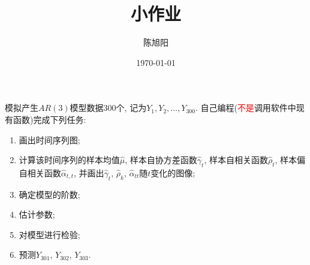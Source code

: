 \documentclass[chinese, lineno, watermark]{assignment}
\title{小作业}
\author{陈旭阳}
\date{\today}
\institute{同济大学数学科学学院}
\begin{document}
    \maketitle

    \begin{problem}
        模拟产生$AR(3)$模型数据300个, 记为$Y_{1}, Y_{2}, \dotsc, Y_{300}$. 自己编程(\textcolor{red}{不是}调用软件中现有函数)完成下列任务:
        \begin{enumerate}[(1)]
            \item 画出时间序列图;
            \item 计算该时间序列的样本均值$\hat{\mu}$, 样本自协方差函数$\hat{\gamma}_{t}$, 样本自相关函数$\hat{\rho}_{t}$, 样本偏自相关函数$\hat{\alpha}_{t, t}$, 并画出$\hat{\gamma}_{t}$, $\hat{\rho}_{k}$, $\hat{\alpha}_{tt}$随$t$变化的图像;
            \item 确定模型的阶数;
            \item 估计参数;
            \item 对模型进行检验;
            \item 预测$Y_{301}$, $Y_{302}$, $Y_{303}$.
        \end{enumerate}
    \end{problem}
\end{document}
